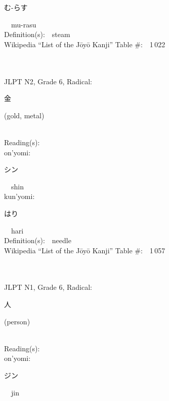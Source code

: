 \begin{multicols}{2}
{\hspace*{2em}}{\begin{CJK}{UTF8}{min} む-らす \end{CJK}}\ \ mu-rasu\ \ \\
Definition(s):\ \ steam \\
Wikipedia ``List of the J\=oy\=o Kanji'' Table \#:\ \ 1\,022 \\
\ \ \\
{\fontsize{34pt}{40pt}  }\ \ \\  %
{JLPT N2, Grade 6, Radical:\ \ {\begin{CJK}{UTF8}{min} 金 \end{CJK}} (gold, metal) } \\
Reading(s):\ \ \\
{\hspace*{1em}}on'yomi:\ \ \\
{\hspace*{2em}}{\begin{CJK}{UTF8}{min} シン \end{CJK}}\ \ shin\ \ \\
{\hspace*{1em}}kun'yomi:\ \ \\
{\hspace*{2em}}{\begin{CJK}{UTF8}{min} はり \end{CJK}}\ \ hari\ \ \\
Definition(s):\ \ needle \\
Wikipedia ``List of the J\=oy\=o Kanji'' Table \#:\ \ 1\,057 \\
\ \ \\
{\fontsize{34pt}{40pt}  }\ \ \\  %
{JLPT N1, Grade 6, Radical:\ \ {\begin{CJK}{UTF8}{min} 人 \end{CJK}} (person) } \\
Reading(s):\ \ \\
{\hspace*{1em}}on'yomi:\ \ \\
{\hspace*{2em}}{\begin{CJK}{UTF8}{min} ジン \end{CJK}}\ \ jin\ \ \\

\end{multicols}
